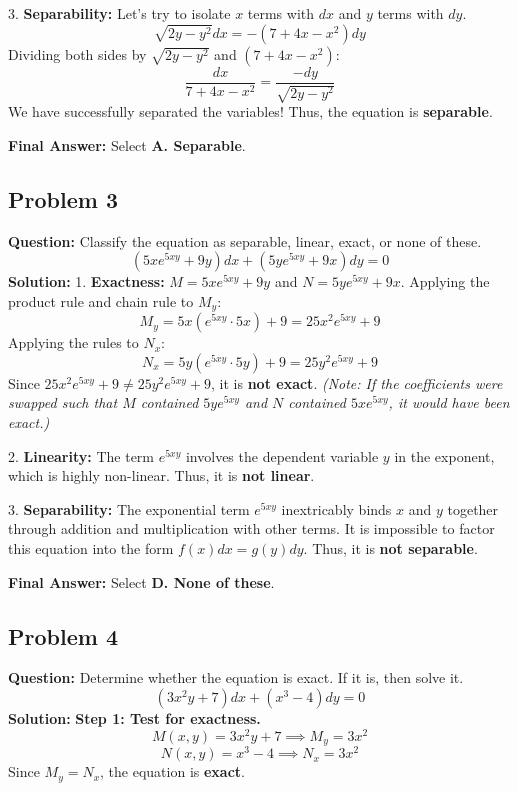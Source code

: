 \documentclass[11pt]{article}
\begin{document}
3. \textbf{Separability:}
Let's try to isolate $x$ terms with $dx$ and $y$ terms with $dy$. 
\[ \sqrt{2y - y^2} dx = -(7 + 4x - x^2) dy \]
Dividing both sides by $\sqrt{2y - y^2}$ and $(7 + 4x - x^2)$:
\[ \frac{dx}{7 + 4x - x^2} = \frac{-dy}{\sqrt{2y - y^2}} \]
We have successfully separated the variables! Thus, the equation is \textbf{separable}.

\textbf{Final Answer:} Select \textbf{A. Separable}.

\vspace{0.5cm}
\subsection*{Problem 3}
\textbf{Question:} Classify the equation as separable, linear, exact, or none of these.
\[ \left(5x e^{5xy} + 9y\right) dx + \left(5y e^{5xy} + 9x\right) dy = 0 \]
\textbf{Solution:} 
1. \textbf{Exactness:}
$M = 5x e^{5xy} + 9y$ and $N = 5y e^{5xy} + 9x$.
Applying the product rule and chain rule to $M_y$:
\[ M_y = 5x \left(e^{5xy} \cdot 5x\right) + 9 = 25x^2 e^{5xy} + 9 \]
Applying the rules to $N_x$:
\[ N_x = 5y \left(e^{5xy} \cdot 5y\right) + 9 = 25y^2 e^{5xy} + 9 \]
Since $25x^2 e^{5xy} + 9 \neq 25y^2 e^{5xy} + 9$, it is \textbf{not exact}. 
\textit{(Note: If the coefficients were swapped such that $M$ contained $5ye^{5xy}$ and $N$ contained $5xe^{5xy}$, it would have been exact.)}

2. \textbf{Linearity:}
The term $e^{5xy}$ involves the dependent variable $y$ in the exponent, which is highly non-linear. Thus, it is \textbf{not linear}.

3. \textbf{Separability:}
The exponential term $e^{5xy}$ inextricably binds $x$ and $y$ together through addition and multiplication with other terms. It is impossible to factor this equation into the form $f(x) dx = g(y) dy$. Thus, it is \textbf{not separable}.

\textbf{Final Answer:} Select \textbf{D. None of these}.

\vspace{0.5cm}
\subsection*{Problem 4}
\textbf{Question:} Determine whether the equation is exact. If it is, then solve it.
\[ \left(3x^2 y + 7\right) dx + \left(x^3 - 4\right) dy = 0 \]
\textbf{Solution:} 
\textbf{Step 1: Test for exactness.}
\[ M(x,y) = 3x^2 y + 7 \implies M_y = 3x^2 \]
\[ N(x,y) = x^3 - 4 \implies N_x = 3x^2 \]
Since $M_y = N_x$, the equation is \textbf{exact}.
\end{document}
